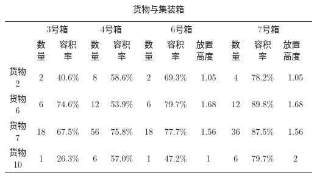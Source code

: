 \documentclass{article}
\begin{document}
	\begin{table}[!h]
		\centering
		\caption{货物与集装箱}
		\begin{tabular}{|c|c|c|c|c|c|c|c|c|c|c|}
			\hline
			\multirow{2}{*}{} & \multicolumn{2}{c|}{3号箱} & \multicolumn{2}{c|}{4号箱} & \multicolumn{3}{c|}{6号箱}                  & \multicolumn{3}{c|}{7号箱}                  \\ \cline{2-11} 
			& 数量       & 容积率         & 数量       & 容积率         & 数量 & 容积率    & \multicolumn{1}{l|}{放置高度} & 数量 & 容积率    & \multicolumn{1}{l|}{放置高度} \\ \hline
			货物2               & 2          & 40.6\%      & 8          & 58.6\%      & 2    & 69.3\% & 1.05                      & 4    & 78.2\% & 1.05                      \\ \hline
			货物6               & 6          & 74.6\%      & 12         & 53.9\%      & 6    & 79.7\% & 1.68                      & 12   & 89.8\% & 1.68                      \\ \hline
			货物7               & 18         & 67.5\%      & 56         & 75.8\%      & 18   & 77.7\% & 1.56                      & 36   & 87.5\% & 1.56                      \\ \hline
			货物10              & 1          & 26.3\%      & 6          & 57.0\%      & 1    & 47.2\% & 1                         & 6    & 79.7\% & 2                         \\ \hline
		\end{tabular}
	\end{table}
\end{document}

